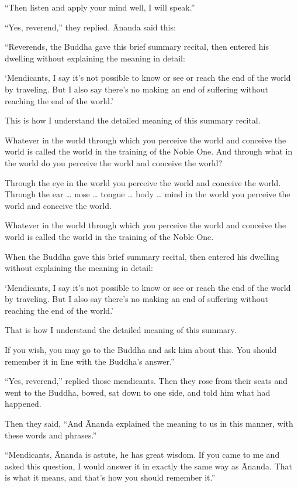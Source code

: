 \documentclass[12pt,openany]{book}%
\begin{document}
“Then listen and apply your mind well, I will speak.” 

“Yes, reverend,” they replied. Ānanda said this: 

“Reverends, the Buddha gave this brief summary recital, then entered his dwelling without explaining the meaning in detail: 

‘Mendicants, I say it’s not possible to know or see or reach the end of the world by traveling. But I also say there’s no making an end of suffering without reaching the end of the world.’ 

This is how I understand the detailed meaning of this summary recital. 

Whatever in the world through which you perceive the world and conceive the world is called the world in the training of the Noble One. And through what in the world do you perceive the world and conceive the world? 

Through the eye in the world you perceive the world and conceive the world. Through the ear … nose … tongue … body … mind in the world you perceive the world and conceive the world. 

Whatever in the world through which you perceive the world and conceive the world is called the world in the training of the Noble One. 

When the Buddha gave this brief summary recital, then entered his dwelling without explaining the meaning in detail: 

‘Mendicants, I say it’s not possible to know or see or reach the end of the world by traveling. But I also say there’s no making an end of suffering without reaching the end of the world.’ 

That is how I understand the detailed meaning of this summary. 

If you wish, you may go to the Buddha and ask him about this. You should remember it in line with the Buddha’s answer.” 

“Yes, reverend,” replied those mendicants. Then they rose from their seats and went to the Buddha, bowed, sat down to one side, and told him what had happened. 

Then they said, “And Ānanda explained the meaning to us in this manner, with these words and phrases.” 

“Mendicants, Ānanda is astute, he has great wisdom. If you came to me and asked this question, I would answer it in exactly the same way as Ānanda. That is what it means, and that’s how you should remember it.” 
\end{document}
